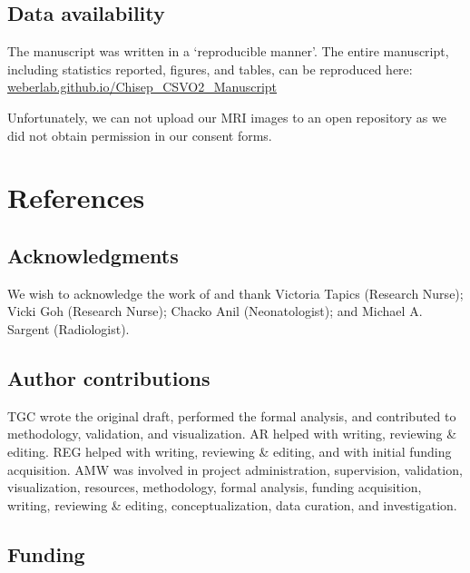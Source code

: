 \documentclass[
true
]{sn-jnl}
\begin{document}
\newpage{}

\subsection{Data availability}\label{data-availability}

The manuscript was written in a `reproducible manner'. The entire
manuscript, including statistics reported, figures, and tables, can be
reproduced here:
\href{https://weberlab.github.io/Chisep_CSVO2_Manuscript}{weberlab.github.io/Chisep\_CSVO2\_Manuscript}

Unfortunately, we can not upload our MRI images to an open repository as
we did not obtain permission in our consent forms.

\section*{References}\label{references}

\renewcommand{\bibsection}{}


\subsection{Acknowledgments}\label{acknowledgments}

We wish to acknowledge the work of and thank Victoria Tapics (Research
Nurse); Vicki Goh (Research Nurse); Chacko Anil (Neonatologist); and
Michael A. Sargent (Radiologist).

\subsection{Author contributions}\label{author-contributions}

TGC wrote the original draft, performed the formal analysis, and
contributed to methodology, validation, and visualization. AR helped
with writing, reviewing \& editing. REG helped with writing, reviewing
\& editing, and with initial funding acquisition. AMW was involved in
project administration, supervision, validation, visualization,
resources, methodology, formal analysis, funding acquisition, writing,
reviewing \& editing, conceptualization, data curation, and
investigation.

\subsection{Funding}\label{funding}
\end{document}
